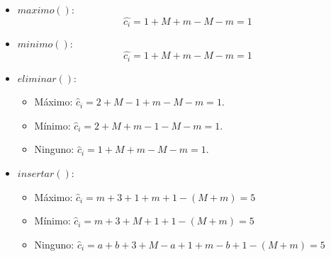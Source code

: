 \documentclass[10pt,a4paper,openright]{book}
\theoremstyle{break}
\begin{document}
\begin{itemize}
    \item $maximo\left( \right)$:
    \[
    \hat{c_i} = 1 + M + m - M - m = 1
    \]
    \item $minimo\left( \right)$:
    \[
    \hat{c_i} = 1 + M + m - M - m = 1
    \]
    \item $eliminar\left( \right)$:
    \begin{itemize}
        \item Máximo: $\hat{c}_i = 2 + M - 1 + m - M - m = 1$.
        \item Mínimo: $\hat{c}_i = 2 + M + m - 1 - M - m = 1$.
        \item Ninguno: $\hat{c}_i = 1 + M + m - M - m = 1$.
    \end{itemize}
    \item $insertar\left( \right)$:
    \begin{itemize}
        \item Máximo: $\hat{c}_i = m + 3 + 1 + m + 1 - \left( M + m \right) = 5$
        \item Mínimo: $\hat{c}_i = m + 3 + M + 1 + 1 - \left( M + m \right) = 5$
        \item Ninguno: $\hat{c}_i = a + b + 3 + M - a + 1 + m - b + 1 - \left( M + m \right) = 5$
    \end{itemize}
\end{itemize}
\end{document}
